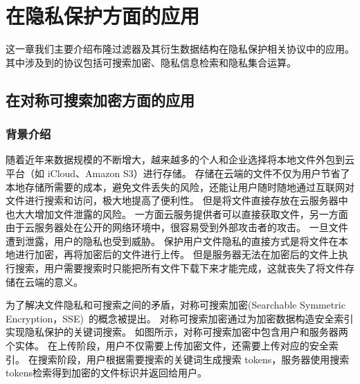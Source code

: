 
\chapter{在隐私保护方面的应用}\label{chp:application}


这一章我们主要介绍布隆过滤器及其衍生数据结构在隐私保护相关协议中的应用。
其中涉及到的协议包括可搜索加密、隐私信息检索和隐私集合运算。

\section{在对称可搜索加密方面的应用}

\subsection{背景介绍}

随着近年来数据规模的不断增大，越来越多的个人和企业选择将本地文件外包到云平台（如 iCloud、Amazon S3）进行存储。
存储在云端的文件不仅为用户节省了本地存储所需要的成本，避免文件丢失的风险，还能让用户随时随地通过互联网对文件进行搜索和访问，极大地提高了便利性。
但是将文件直接存放在云服务器中也大大增加文件泄露的风险。
一方面云服务提供者可以直接获取文件，另一方面由于云服务器处在公开的网络环境中，很容易受到外部攻击者的攻击。
一旦文件遭到泄露，用户的隐私也受到威胁。
保护用户文件隐私的直接方式是将文件在本地进行加密，再将加密后的文件进行上传。
但是服务器无法在加密后的文件上执行搜索，用户需要搜索时只能把所有文件下载下来才能完成，这就丧失了将文件存储在云端的意义。

为了解决文件隐私和可搜索之间的矛盾，对称可搜索加密(Searchable Symmetric Encryption，SSE)~\cite{song2000practical,curtmola2006searchable}的概念被提出。
对称可搜索加密通过为加密数据构造安全索引实现隐私保护的关键词搜索。
如图所示，对称可搜索加密中包含用户和服务器两个实体。
在上传阶段，用户不仅需要上传加密文件，还需要上传对应的安全索引。
在搜索阶段，用户根据需要搜索的关键词生成搜索 tokens，服务器使用搜索tokens检索得到加密的文件标识并返回给用户。

